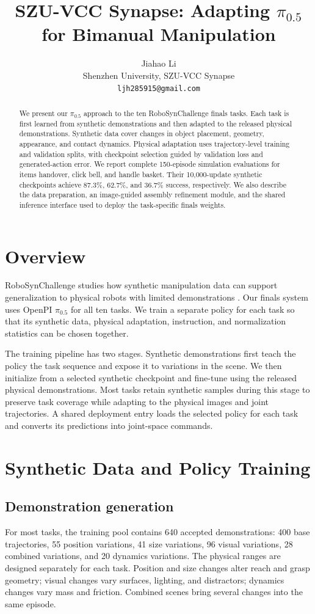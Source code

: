 \documentclass{article}
\title{SZU-VCC Synapse: Adapting $\pi_{0.5}$\\for Bimanual Manipulation}
\author{Jiahao Li \\
Shenzhen University, SZU-VCC Synapse \\
\texttt{ljh285915@gmail.com}}
\begin{document}
\maketitle

\begin{abstract}
We present our $\pi_{0.5}$ approach to the ten RoboSynChallenge finals tasks.
Each task is first learned from synthetic demonstrations and then adapted
to the released physical demonstrations. Synthetic data cover changes in
object placement, geometry, appearance, and contact dynamics. Physical
adaptation uses trajectory-level training and validation splits, with
checkpoint selection guided by validation loss and generated-action error.
We report complete 150-episode simulation evaluations for items handover,
click bell, and handle basket. Their 10,000-update synthetic checkpoints
achieve 87.3\%, 62.7\%, and 36.7\% success, respectively. We also describe
the data preparation, an image-guided assembly refinement module, and the
shared inference interface used to deploy the task-specific finals weights.
\end{abstract}

\section{Overview}
RoboSynChallenge studies how synthetic manipulation data can support
generalization to physical robots with limited demonstrations
\citep{robosynchallenge}. Our finals system uses OpenPI $\pi_{0.5}$
\citep{pi05,openpi} for all ten tasks. We train a separate policy for each
task so that its synthetic data, physical adaptation, instruction, and
normalization statistics can be chosen together.

The training pipeline has two stages. Synthetic demonstrations first teach
the policy the task sequence and expose it to variations in the scene.
We then initialize from a selected synthetic checkpoint and fine-tune
using the released physical demonstrations. Most tasks retain synthetic
samples during this stage to preserve task coverage while adapting to
the physical images and joint trajectories. A shared deployment entry
loads the selected policy for each task and converts its predictions into
joint-space commands.

\section{Synthetic Data and Policy Training}
\subsection{Demonstration generation}
For most tasks, the training pool contains 640 accepted demonstrations:
400 base trajectories, 55 position variations, 41 size variations, 96
visual variations, 28 combined variations, and 20 dynamics variations.
The physical ranges are designed separately for each task. Position and
size changes alter reach and grasp geometry; visual changes vary surfaces,
lighting, and distractors; dynamics changes vary mass and friction.
Combined scenes bring several changes into the same episode.
\end{document}
